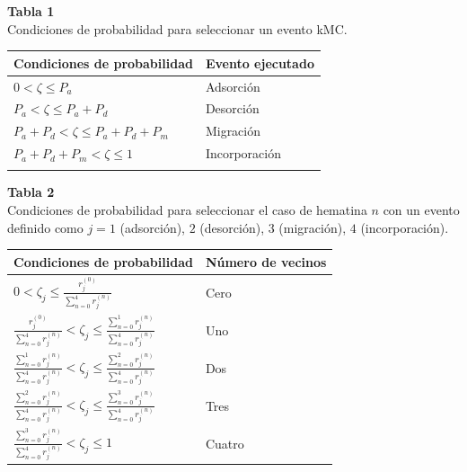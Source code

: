 \documentclass[12pt,letterpaper,oneside]{report}
\begin{document}
\begin{table}[h!]
\centering
\begin{minipage}{0.78\textwidth}
\raggedright
\textbf{Tabla 1}\\
Condiciones de probabilidad para seleccionar un evento kMC.
\vspace{0.6em}

\centering
\renewcommand{\arraystretch}{1.25}
\setlength{\tabcolsep}{18pt}
\begin{tabular}{@{}>{\centering\arraybackslash}p{} >{\centering\arraybackslash}p{}@{}}
\hline
\textbf{Condiciones de probabilidad} & \textbf{Evento ejecutado} \\
\hline
$0<\zeta\leq P_a$ & Adsorción \\
$P_a<\zeta\leq P_a+P_d$ & Desorción \\
$P_a+P_d<\zeta\leq P_a+P_d+P_m$ & Migración \\
$P_a+P_d+P_m<\zeta\leq 1$ & Incorporación \\
\hline
\label{tab:table1}
\end{tabular}
\end{minipage}
\end{table}

\vspace{1.4em}

\begin{table}[h!]
\centering
\begin{minipage}{0.88\textwidth}
\raggedright
\textbf{Tabla 2}\\
Condiciones de probabilidad para seleccionar el caso de hematina $n$ con un evento definido como $j=1$ (adsorción), $2$ (desorción), $3$ (migración), $4$ (incorporación).
\vspace{0.6em}

\centering
\renewcommand{\arraystretch}{1.25}
\setlength{\tabcolsep}{16pt}
\begin{tabular}{@{}>{\centering\arraybackslash}p{} >{\centering\arraybackslash}p{}@{}}
\hline
\textbf{Condiciones de probabilidad} & \textbf{Número de vecinos} \\
\hline
$\displaystyle 0<\zeta_j \leq \frac{r_j^{(0)}}{\sum_{n=0}^{4} r_j^{(n)}}$ & Cero \\
$\displaystyle \frac{r_j^{(0)}}{\sum_{n=0}^{4} r_j^{(n)}} < \zeta_j \leq \frac{\sum_{n=0}^{1} r_j^{(n)}}{\sum_{n=0}^{4} r_j^{(n)}}$ & Uno \\
$\displaystyle \frac{\sum_{n=0}^{1} r_j^{(n)}}{\sum_{n=0}^{4} r_j^{(n)}} < \zeta_j \leq \frac{\sum_{n=0}^{2} r_j^{(n)}}{\sum_{n=0}^{4} r_j^{(n)}}$ & Dos \\
$\displaystyle \frac{\sum_{n=0}^{2} r_j^{(n)}}{\sum_{n=0}^{4} r_j^{(n)}} < \zeta_j \leq \frac{\sum_{n=0}^{3} r_j^{(n)}}{\sum_{n=0}^{4} r_j^{(n)}}$ & Tres \\
$\displaystyle \frac{\sum_{n=0}^{3} r_j^{(n)}}{\sum_{n=0}^{4} r_j^{(n)}} < \zeta_j \leq 1$ & Cuatro \\
\hline
\end{tabular}
\end{minipage}
\end{table}\\
\end{document}
